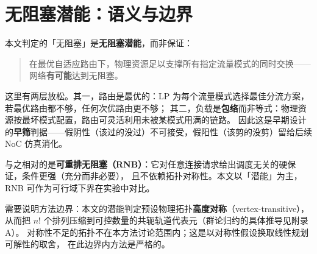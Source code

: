 \section{无阻塞潜能：语义与边界}\label{sec:bg-nonblocking}

本文判定的「无阻塞」是\textbf{无阻塞潜能}，而非保证：

\begin{quote}
在最优自适应路由下，物理资源足以支撑所有指定流量模式的同时交换——网络\textbf{有可能}达到无阻塞。
\end{quote}

这里有两层放松。其一，路由是最优的：LP 为每个流量模式选择最佳分流方案，
若最优路由都不够，任何次优路由更不够；
其二，负载是\textbf{包络}而非等式：物理资源按最坏模式配置，路由可灵活利用未被某模式用满的链路。
因此这是早期设计的\textbf{早筛}判据——假阴性（该过的没过）不可接受，假阳性（该剪的没剪）留给后续 NoC 仿真消化。

与之相对的是\textbf{可重排无阻塞（RNB）}：它对任意连接请求给出调度无关的硬保证，条件更强（充分而非必要），
且不依赖拓扑对称性。本文以「潜能」为主，RNB 可作为可行域下界在实验中对比。

需要说明方法边界：本文的潜能判定预设物理拓扑\textbf{高度对称}（vertex-transitive），
从而把 $n!$ 个排列压缩到可控数量的共轭轨道代表元（群论归约的具体推导见附录 A）。
对称性不足的拓扑不在本方法讨论范围内；这是以对称性假设换取线性规划可解性的取舍，
在此边界内方法是严格的。
